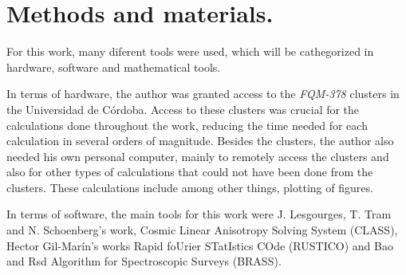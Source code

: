 \chapter{Methods and materials.}

For this work, many diferent tools were used, which will be cathegorized in hardware, software and mathematical tools. 

In terms of hardware, the author was granted access to the \textit{FQM-378} clusters in the Universidad de Córdoba. Access to these clusters was crucial for the calculations done throughout the work, reducing the time needed for each calculation in several orders of magnitude. Besides the clusters, the author also needed his own personal computer, mainly to remotely access the clusters and also for other types of calculations that could not have been done from the clusters. These calculations include among other things, plotting of figures. 

In terms of software, the main tools for this work were J. Lesgourges, T. Tram and N. Schoenberg's work, Cosmic Linear Anisotropy Solving System (CLASS), Hector Gil-Marín's works Rapid foUrier STatIstics COde (RUSTICO) and Bao and Rsd Algorithm for Spectroscopic Surveys (BRASS).


	
